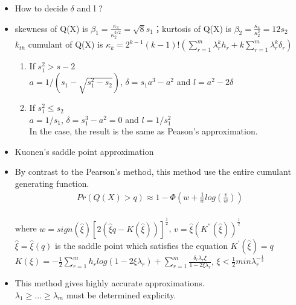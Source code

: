 \documentclass[10pt]{beamer}
\begin{document}
\begin{frame}
	\begin{itemize}
		\item How to decide $\delta$ and l ?
		\item skewness of Q(X) is $\beta_1=\frac{\kappa_3}{\kappa_2^{3/2}}=\sqrt{8}s_1$；kurtosis of Q(X) is $\beta_2=\frac{\kappa_4}{\kappa_2^2}=12s_2$\\
		$k_{th}$ cumulant of Q(X) is $\kappa_k=2^{k-1}(k-1)!(\sum_{r=1}^m\lambda_r^kh_r+k \sum_{r=1}^m\lambda_r^k\delta_r)$
		\begin{enumerate}
			\item If $s_1^2 >s-2$\\
			$a=1/(s_1-\sqrt{s_1^2-s_2})$,   $\delta=s_1a^3-a^2$ and $l=a^2-2\delta$
			\item If $s_1^2\leq s_2$\\
			$a=1/s_1$, $\delta=s_1^3-a^2=0$ and $l=1/s_1^2$\\
			In the case, the result is the same as Peason's approximation.
		\end{enumerate}
	\end{itemize}
\end{frame}

\begin{frame}
	\begin{itemize}
		\item Kuonen's saddle point approximation 
		\item By contrast to the Pearson's method, this method use the entire cumulant generating function.
		\begin{align}
		Pr(Q(X)>q)\approx 1-\Phi(w+\frac{1}{w}log(\frac{v}{w}))
		\end{align}\\
		where $w=sign(\hat{\xi})[2(\hat{\xi}q-K(\hat{\xi}))]^{\frac{1}{2}}$,  $v=\hat{\xi}(K^{''}(\hat{\xi}))^{\frac{1}{2}}$\\
		$\hat{\xi}=\hat{\xi}(q)$ is the saddle point which satisfies the equation $K^{'}(\hat{\xi})=q$\\
	    $K(\xi)=-\frac{1}{2}\sum_{r=1}^mh_rlog(1-2\xi\lambda_r)+\sum_{r=1}^{m}\frac{\delta_r\lambda_r\xi}{1-2\xi\lambda_r}$, $\xi< \frac{1}{2}min \lambda_r^{-\frac{1}{2}}$
	    \item This method gives highly accurate approximations.\\
	    $\lambda_1\geq...\geq\lambda_m$ must be determined explicity.
	\end{itemize}
\end{frame}
\end{document}
